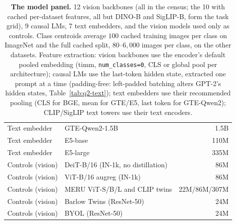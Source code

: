 \begin{table}[H]
\begin{tabular}{llr}
Text embedder & GTE-Qwen2-1.5B \citep{gte} & 1.5B \\
Text embedder & E5-base \citep{e5} & 110M \\
Text embedder & E5-large \citep{e5} & 335M \\
\midrule
Controls (vision) & DeiT-B/16 (IN-1k, no distillation) \citep{deit} & 86M \\
Controls (vision) & ViT-B/16 augreg (IN-1k) \citep{augreg} & 86M \\
Controls (vision) & MERU ViT-S/B/L and CLIP twins \citep{desai2023meru} & 22M/86M/307M \\
Controls (vision) & Barlow Twins (ResNet-50) \citep{zbontar2021barlow} & 24M \\
Controls (vision) & BYOL (ResNet-50) \citep{grill2020bootstrap} & 24M \\
\bottomrule
\end{tabular}
\par\vspace{5pt}
\caption{\textbf{The model panel.} 12 vision backbones (all in the census; the 10 with cached per-dataset features, all but DINO-B and SigLIP-B, form the task grid), 9 causal LMs, 7 text embedders, and the vision models used only as controls. Class centroids average $100$ cached training images per class on ImageNet and the full cached split, $80$--$6{,}000$ images per class, on the other datasets. Feature extraction: vision backbones use the encoder's default pooled embedding (timm, \texttt{num\_classes=0}, CLS or global pool per architecture); causal LMs use the last-token hidden state, extracted one prompt at a time (padding-free: left-padded batching alters GPT-2's hidden states, Table~\ref{tab:q2-text}); text embedders use their recommended pooling (CLS for BGE, mean for GTE/E5, last token for GTE-Qwen2); CLIP/SigLIP text towers use their text encoders.
}
\label{tab:q14-panel}
\end{table}
